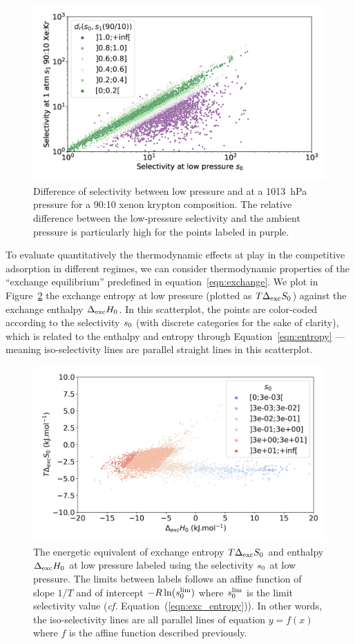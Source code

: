 \documentclass[main.tex]{subfiles}
\begin{document}
\begin{figure}[t]
  \centering
    \includegraphics[width=0.6\linewidth]{figures/2-thermo/s_0_vs_s_9010_overview_log.jpg}
    \caption{Difference of selectivity between low pressure and at a \SI{1013}{\hecto\pascal} pressure for a 90:10 xenon krypton composition. The relative difference between the low-pressure selectivity and the ambient pressure is particularly high for the points labeled in purple.}
    \label{fgr:overview_9010}
\end{figure}
  
To evaluate quantitatively the thermodynamic effects at play in the competitive adsorption in different regimes, we can consider thermodynamic properties of the ``exchange equilibrium'' predefined in equation~\ref{eqn:exchange}. We plot in Figure~\ref{fgr:HSplot_0} the exchange entropy at low pressure (plotted as $T\Delta_{\text{exc}}S_{\text{0}}$) against the exchange enthalpy $\Delta_{\text{exc}}H_{\text{0}}$. In this scatterplot, the points are color-coded according to the selectivity $s_{\text{0}}$ (with discrete categories for the sake of clarity), which is related to the enthalpy and entropy through Equation~\ref{eqn:entropy} --- meaning iso-selectivity lines are parallel straight lines in this scatterplot.
  
\begin{figure}[t]
\centering
  \includegraphics[width=0.6\linewidth]{figures/2-thermo/enthalpy_entropy_0_s_0.jpg}
  \caption{The energetic equivalent of exchange entropy $T\Delta_{\text{exc}}S_{\text{0}}$ and enthalpy $\Delta_{\text{exc}}H_{\text{0}}$ at low pressure labeled using the selectivity $s_{\text{0}}$ at low pressure. The limits between labels follows an affine function of slope $1/T$ and of intercept $-R\ln(s_{\text{0}}^{\text{lim}})$ where $s_{\text{0}}^{\text{lim}}$ is the limit selectivity value (\emph{cf.} Equation~(\ref{eqn:exc_entropy})). In other words, the iso-selectivity lines are all parallel lines of equation $y=f(x)$ where $f$ is the affine function described previously.}
  \label{fgr:HSplot_0}
\end{figure}
\end{document}
